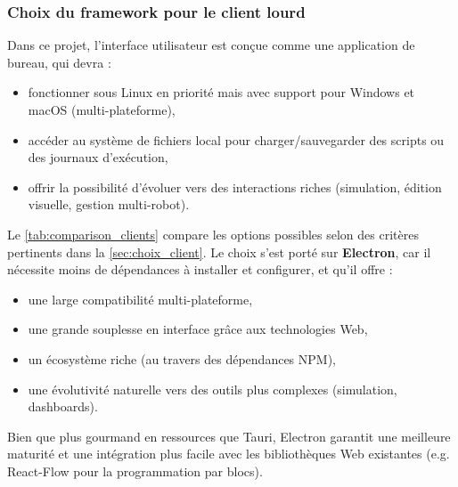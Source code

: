 \subsubsection{Choix du framework pour le client lourd} \label{sec:client_code}

Dans ce projet, l’interface utilisateur est conçue comme une application de bureau, qui devra :
\begin{itemize}
    \item fonctionner sous Linux en priorité mais avec support pour Windows et macOS (multi-plateforme),
    \item accéder au système de fichiers local pour charger/sauvegarder des scripts ou des journaux d'exécution,
    \item offrir la possibilité d'évoluer vers des interactions riches (simulation, édition visuelle, gestion multi-robot).
\end{itemize}

Le \autoref{tab:comparison_clients} compare les options possibles selon des critères pertinents dans la \autoref{sec:choix_client}.
Le choix s’est porté sur \textbf{Electron}, car il nécessite moins de dépendances à installer et configurer, et qu'il offre :
\begin{itemize}
    \item une large compatibilité multi-plateforme,
    \item une grande souplesse en interface grâce aux technologies Web,
    \item un écosystème riche (au travers des dépendances NPM),
    \item une évolutivité naturelle vers des outils plus complexes (simulation, dashboards).
\end{itemize}

Bien que plus gourmand en ressources que Tauri, Electron garantit une meilleure maturité et une intégration plus facile avec les bibliothèques Web existantes (e.g. React-Flow pour la programmation par blocs).
